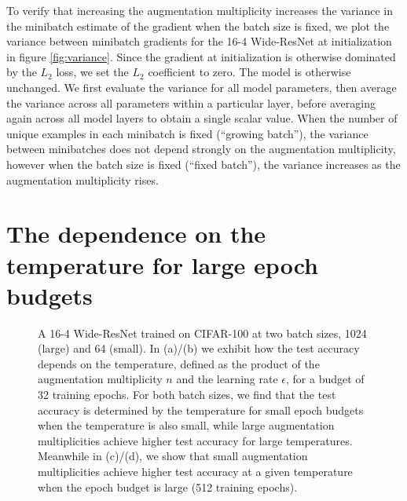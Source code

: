 \documentclass{article}
\begin{document}
To verify that increasing the augmentation multiplicity increases the variance in the minibatch estimate of the gradient when the batch size is fixed, we plot the variance between minibatch gradients for the 16-4 Wide-ResNet at initialization in figure \ref{fig:variance}. Since the gradient at initialization is otherwise dominated by the $L_2$ loss, we set the $L_2$ coefficient to zero. The model is otherwise unchanged. We first evaluate the variance for all model parameters, then average the variance across all parameters within a particular layer, before averaging again across all model layers to obtain a single scalar value. When the number of unique examples in each minibatch is fixed (``growing batch''), the variance between minibatches does not depend strongly on the augmentation multiplicity, however when the batch size is fixed (``fixed batch''), the variance increases as the augmentation multiplicity rises.

\section{The dependence on the temperature for large epoch budgets}
\label{app:large_budget_temp}

\begin{figure}[h]
\centering
{}

\caption{A 16-4 Wide-ResNet trained on CIFAR-100 at two batch sizes, 1024 (large) and 64 (small). In (a)/(b) we exhibit how the test accuracy depends on the temperature, defined as the product of the augmentation multiplicity $n$ and the learning rate $\epsilon$, for a budget of 32 training epochs. For both batch sizes, we find that the test accuracy is determined by the temperature for small epoch budgets when the temperature is also small, while large augmentation multiplicities achieve higher test accuracy for large temperatures. Meanwhile in (c)/(d), we show that small augmentation multiplicities achieve higher test accuracy at a given temperature when the epoch budget is large (512 training epochs).
}
\label{fig:large_epoch}
\end{figure}
\end{document}
